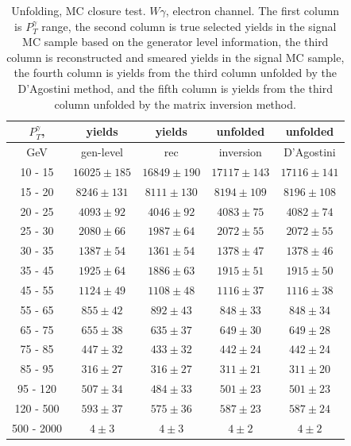 \begin{table}[h]
  \scriptsize
  \begin{center}
  \caption{Unfolding, MC closure test. $W\gamma$, electron channel. The first column is $P_T^{\gamma}$ range, the second column is true selected yields in the signal MC sample based on the generator level information, the third column is reconstructed and smeared yields in the signal MC sample, the fourth column is yields from the third column unfolded by the D'Agostini method, and the fifth column is yields from the third column unfolded by the matrix inversion method. }
  \begin{tabular}{|c|c|c|c|c|}
  \hline
  $P_T^{\gamma}$, &  yields &   yields &  unfolded &  unfolded \\ \hline
  GeV &  gen-level & rec &  inversion &  D'Agostini \\ \hline
 10 -  15 &     $16025\pm 185$ &     $16849\pm 190$ &     $17117\pm143$ &     $17116\pm141$ \\ \hline
 15 -  20 &     $8246\pm 131$ &     $8111\pm 130$ &     $8194\pm109$ &     $8196\pm108$ \\ \hline
 20 -  25 &     $4093\pm  92$ &     $4046\pm  92$ &     $4083\pm75$ &     $4082\pm74$ \\ \hline
 25 -  30 &     $2080\pm  66$ &     $1987\pm  64$ &     $2072\pm55$ &     $2072\pm55$ \\ \hline
 30 -  35 &     $1387\pm  54$ &     $1361\pm  54$ &     $1378\pm47$ &     $1378\pm46$ \\ \hline
 35 -  45 &     $1925\pm  64$ &     $1886\pm  63$ &     $1915\pm51$ &     $1915\pm50$ \\ \hline
 45 -  55 &     $1124\pm  49$ &     $1108\pm  48$ &     $1116\pm37$ &     $1116\pm38$ \\ \hline
 55 -  65 &     $855\pm  42$ &     $892\pm  43$ &     $848\pm33$ &     $848\pm34$ \\ \hline
 65 -  75 &     $655\pm  38$ &     $635\pm  37$ &     $649\pm30$ &     $649\pm28$ \\ \hline
 75 -  85 &     $447\pm  32$ &     $433\pm  32$ &     $442\pm24$ &     $442\pm24$ \\ \hline
 85 -  95 &     $316\pm  27$ &     $316\pm  27$ &     $311\pm21$ &     $311\pm20$ \\ \hline
 95 - 120 &     $507\pm  34$ &     $484\pm  33$ &     $501\pm23$ &     $501\pm23$ \\ \hline
120 - 500 &     $593\pm  37$ &     $575\pm  36$ &     $587\pm23$ &     $587\pm24$ \\ \hline
500 - 2000 &     $4\pm   3$ &     $4\pm   3$ &     $4\pm2$ &     $4\pm2$ \\ \hline
  \end{tabular}
  \label{tab:unf_mc_closure_ELECTRON_WGamma}
  \end{center}
\end{table}
